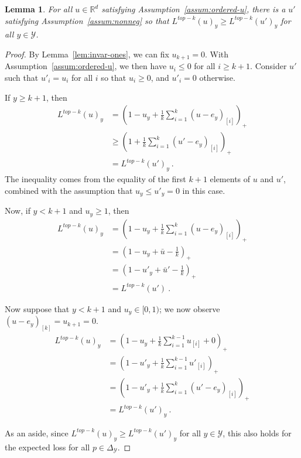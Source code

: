 \documentclass[12pt]{article}
\newcommand{\Comments}{1}
\newcommand{\mynote}[2]{\ifnum\Comments=1\textcolor{#1}{#2}\fi}
\newcommand{\raf}[1]{\mynote{green}{[RF: #1]}}
\newcommand{\reals}{\mathbb{R}}
\newcommand{\simplex}{\Delta_\Y}
\newcommand{\Y}{\mathcal{Y}}
\newtheorem{lemma}{Lemma}
\begin{document}
\begin{lemma}\label{lem:extra-elts-zero}
	For all $u \in \reals^d$ satisfying Assumption~\ref{assum:ordered-u}, there is a $u'$ satisfying Assumption~\ref{assum:nonneg} so that $L^{top-k}(u)_y \geq L^{top-k}(u')_y$ for all $y \in \Y$.
\end{lemma}
\begin{proof}
	By Lemma~\ref{lem:invar-ones}, we can fix $u_{k+1} = 0$.
	With Assumption~\ref{assum:ordered-u}, we then have $u_i \leq 0$ for all $i \geq k+1$.
	Consider $u'$ such that $u'_i = u_i$ for all $i$ so that $u_i \geq 0$, and $u'_i = 0$ otherwise.
	
	If $y \geq k+1$, then 
	\begin{align*}
	L^{top-k}(u)_y &= (1 - u_y + \frac 1 k \sum_{i=1}^k (u - e_y)_{[i]})_+ \\
	&\geq \left(1 + \frac {1}{k} \sum_{i=1}^k (u' - e_y)_{[i]}\right)_+\\
	&= L^{top-k}(u')_y~.~
	\end{align*}
	The inequality comes from the equality of the first $k+1$ elements of $u$ and $u'$, combined with the assumption that $u_y \leq u'_y = 0$ in this case.
	
	Now, if $y < k+1$ and $u_y \geq 1$, then 
	\begin{align*}
	L^{top-k}(u)_y &= \left(1 - u_y + \frac 1 k \sum_{i=1}^k (u - e_y)_{[i]}\right)_+ \\
	&= \left(1 - u_y + \bar u - \frac 1 k\right)_+\\
	&= \left(1 - u'_y + \bar u' - \frac 1 k\right)_+\\
	&= L^{top-k}(u')~.~
	\end{align*}
	
	Now suppose that $y < k+1$ and $u_y \in [0,1)$; we now observe $(u - e_y)_{[k]} = u_{k+1} = 0$. 
	\begin{align*}
	L^{top-k}(u)_y &= \left(1 - u_y + \frac 1 k \sum_{i=1}^{k-1} u_{[i]} + 0 \right)_+\\
	&= \left(1 - u'_y + \frac 1 k \sum_{i=1}^{k-1} u'_{[i]}\right)_+\\
	&= \left(1 - u'_y + \frac 1 k \sum_{i=1}^{k} (u' - e_y)_{[i]}\right)_+\\
	&= L^{top-k}(u')_y~.~
	\end{align*}

	As an aside, since $L^{top-k}(u)_y \geq L^{top-k}(u')_y$ for all $y \in \Y$, this also holds for the expected loss for all $p \in \simplex$.
\end{proof}
\end{document}
